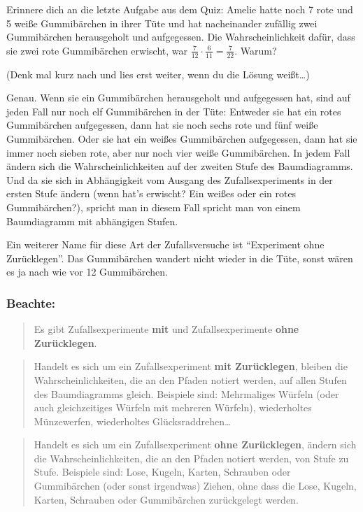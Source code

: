 \documentclass[
  ngerman,
]{book}
\begin{document}
Erinnere dich an die letzte Aufgabe aus dem Quiz: Amelie hatte noch 7 rote und 5 weiße Gummibärchen in ihrer Tüte und hat nacheinander zufällig zwei Gummibärchen herausgeholt und aufgegessen. Die Wahrscheinlichkeit dafür, dass sie zwei rote Gummibärchen erwischt, war \(\frac{7}{12} \cdot \frac {6}{11} = \frac{7}{22}\). Warum?

(Denk mal kurz nach und lies erst weiter, wenn du die Lösung weißt\ldots)

Genau. Wenn sie ein Gummibärchen herausgeholt und aufgegessen hat, sind auf jeden Fall nur noch elf Gummibärchen in der Tüte: Entweder sie hat ein rotes Gummibärchen aufgegessen, dann hat sie noch sechs rote und fünf weiße Gummibärchen. Oder sie hat ein weißes Gummibärchen aufgegessen, dann hat sie immer noch sieben rote, aber nur noch vier weiße Gummibärchen. In jedem Fall ändern sich die Wahrscheinlichkeiten auf der zweiten Stufe des Baumdiagramms. Und da sie sich in Abhängigkeit vom Ausgang des Zufallsexperiments in der ersten Stufe ändern (wenn hat's erwischt? Ein weißes oder ein rotes Gummibärchen?), spricht man in diesem Fall spricht man von einem Baumdiagramm mit abhängigen Stufen.

Ein weiterer Name für diese Art der Zufallsversuche ist ``Experiment ohne Zurücklegen''. Das Gummibärchen wandert nicht wieder in die Tüte, sonst wären es ja nach wie vor 12 Gummibärchen.

\hypertarget{beachte}{%
\subsubsection*{Beachte:}\label{beachte}}

\begin{quote}
Es gibt Zufallsexperimente \textbf{mit} und Zufallsexperimente \textbf{ohne Zurücklegen}.
\end{quote}

\begin{quote}
Handelt es sich um ein Zufallsexperiment \textbf{mit Zurücklegen}, bleiben die Wahrscheinlichkeiten, die an den Pfaden notiert werden, auf allen Stufen des Baumdiagramms gleich. Beispiele sind: Mehrmaliges Würfeln (oder auch gleichzeitiges Würfeln mit mehreren Würfeln), wiederholtes Münzewerfen, wiederholtes Glücksraddrehen\ldots{}
\end{quote}

\begin{quote}
Handelt es sich um ein Zufallsexperiment \textbf{ohne Zurücklegen}, ändern sich die Wahrscheinlichkeiten, die an den Pfaden notiert werden, von Stufe zu Stufe. Beispiele sind: Lose, Kugeln, Karten, Schrauben oder Gummibärchen (oder sonst irgendwas) Ziehen, ohne dass die Lose, Kugeln, Karten, Schrauben oder Gummibärchen zurückgelegt werden.
\end{quote}
\end{document}

